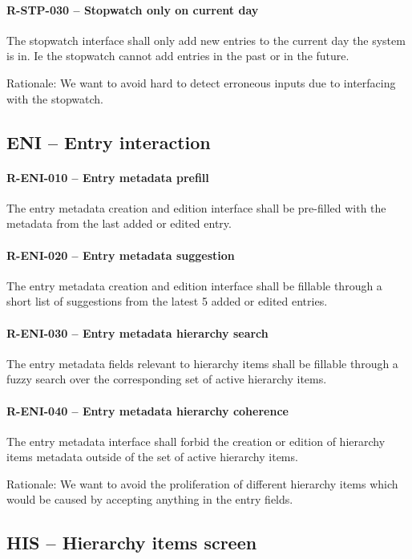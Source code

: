 \paragraph{R-STP-030 -- Stopwatch only on current day}
The stopwatch interface shall only add new entries to the current day
the system is in. Ie the stopwatch cannot add entries in the past or in
the future.

Rationale: We want to avoid hard to detect erroneous inputs due to interfacing
with the stopwatch.

\subsection{ENI -- Entry interaction}
\paragraph{R-ENI-010 -- Entry metadata prefill}
The entry metadata creation and edition interface shall be pre-filled with
the metadata from the last added or edited entry.

\paragraph{R-ENI-020 -- Entry metadata suggestion}
The entry metadata creation and edition interface shall be fillable through
a short list of suggestions from the latest 5 added or edited entries.

\paragraph{R-ENI-030 -- Entry metadata hierarchy search}
The entry metadata fields relevant to hierarchy items shall be fillable
through a fuzzy search over the corresponding set of active hierarchy items.

\paragraph{R-ENI-040 -- Entry metadata hierarchy coherence}
The entry metadata interface shall forbid the creation or edition of
hierarchy items metadata outside of the set of active hierarchy items.

Rationale: We want to avoid the proliferation of different hierarchy items which
would be caused by accepting anything in the entry fields.

\subsection{HIS -- Hierarchy items screen}
